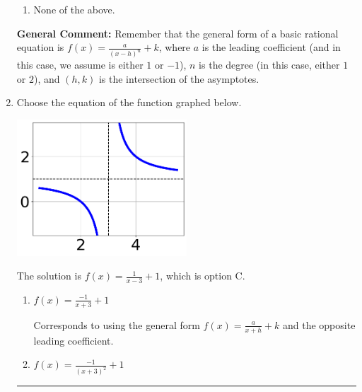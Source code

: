 \documentclass{extbook}[14pt]
\newcommand{\litem}[1]{\item #1

\rule{\textwidth}{0.4pt}}
\begin{document}
\begin{enumerate}
{\begin{enumerate}[label=\Alph*.]
\item None of the above.\end{enumerate}
\textbf{General Comment:} Remember that the general form of a basic rational equation is $ f(x) = \frac{a}{(x-h)^n} + k$, where $a$ is the leading coefficient (and in this case, we assume is either $1$ or $-1$), $n$ is the degree (in this case, either $1$ or $2$), and $(h, k)$ is the intersection of the asymptotes.
}
\litem{
Choose the equation of the function graphed below.

\begin{center}
    \includegraphics[width=0.5\textwidth]{../Figures/rationalGraphToEquationC.png}
\end{center}


The solution is \( f(x) = \frac{1}{x - 3} + 1 \), which is option C.\begin{enumerate}[label=\Alph*.]
\item \( f(x) = \frac{-1}{x + 3} + 1 \)

Corresponds to using the general form $f(x) = \frac{a}{x+h}+k$ and the opposite leading coefficient.
\item \( f(x) = \frac{-1}{(x + 3)^2} + 1 \)


\end{enumerate}}
\end{enumerate}
\end{document}
